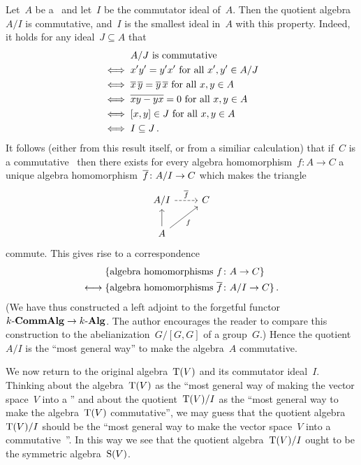 \begin{remark}
  Let~$A$ be a~{\kalg} and let~$I$ be the commutator ideal of~$A$.
  Then the quotient algebra~$A/I$ is commutative, and~$I$ is the smallest ideal in~$A$ with this property.
  Indeed, it holds for any {\twosided} ideal~$J \subseteq A$ that
  \begin{align*}
        {}& \text{$A/J$ is commutative} \\
    \iff{}& \text{$x' y' = y' x'$ for all~$x', y' \in A/J$} \\
    \iff{}& \text{$\overline{x} \, \overline{y} = \overline{y} \, \overline{x}$ for all~$x, y \in A$} \\
    \iff{}& \text{$\overline{xy - yx} = 0$ for all~$x, y \in A$} \\
    \iff{}& \text{$[x,y] \in J$ for all~$x, y \in A$} \\
    \iff{}& I \subseteq J \,.
  \end{align*}
  It follows (either from this result itself, or from a similiar calculation) that if~$C$ is a commutative~{\kalg} then there exists for every algebra homomorphism~$f \colon A \to C$ a unique algebra homomorphism~$\overline{f} \colon A/I \to C$ which makes the triangle
  \[
    \begin{tikzcd}
        A/I
        \arrow[dashed]{r}[above]{\induced{f}}
      & C
      \\
        A
        \arrow{u}
        \arrow{ur}[below right]{f}
      & {}
    \end{tikzcd}
  \]
  commute.
  This gives rise to a {\onetoone} correspondence
  \begin{align*}
      {}&\{ \text{algebra homomorphisms~$f \colon A \to C$} \}  \\
    \longleftrightarrow{}&
      \{ \text{algebra homomorphisms~$\overline{f} \colon A/I \to C$} \} \,.
  \end{align*}
  (We have thus constructed a left adjoint to the forgetful functor~$\text{$k$-$\mathbf{CommAlg}$} \to \text{$k$-$\mathbf{Alg}$}$.
  The author encourages the reader to compare this construction to the abelianization~$G/[G,G]$ of a group~$G$.)
  Hence the quotient~$A/I$ is the \enquote{most general way} to make the algebra~$A$ commutative.
\end{remark}

We now return to the original algebra~$\operatorname{T}(V)$ and its commutator ideal~$I$.
Thinking about the algebra~$\operatorname{T}(V)$ as the \enquote{most general way of making the vector space~$V$ into a {\kalg}} and about the quotient~$\operatorname{T}(V)/I$ as the \enquote{most general way to make the algebra~$\operatorname{T}(V)$ commutative}, we may guess that the quotient algebra~$\operatorname{T}(V)/I$ should be the \enquote{most general way to make the vector space~$V$ into a commutative~{\kalg}}.
In this way we see that the quotient algebra~$\operatorname{T}(V)/I$ ought to be the symmetric algebra~$\operatorname{S}(V)$.

